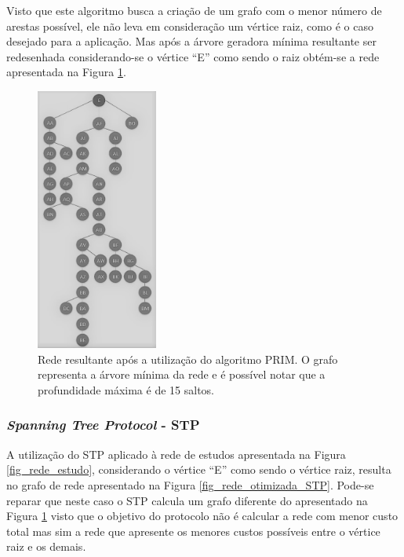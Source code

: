 \documentclass[12pt]{article}
\begin{document}
Visto que este algoritmo busca a criação de um grafo com o menor número de arestas possível, ele não leva em consideração um vértice raiz, como é o caso desejado para a aplicação. Mas após a árvore geradora mínima resultante ser redesenhada considerando-se o vértice ``E'' como sendo o raiz obtém-se a rede apresentada na Figura \ref{fig_rede_otimizada_prim}.

\begin{figure} %
	\centering
	\includegraphics[width=4cm]{Otimizada_Prim_PB}
	\caption{Rede resultante após a utilização do algoritmo PRIM. O grafo representa a árvore mínima da rede e é possível notar que a profundidade máxima é de 15 saltos.}
	\label{fig_rede_otimizada_prim}
\end{figure}

\subsubsection{\emph{Spanning Tree Protocol} - STP}
A utilização do STP aplicado à rede de estudos apresentada na Figura \ref{fig_rede_estudo}, considerando o vértice ``E'' como sendo o vértice raiz, resulta no grafo de rede apresentado na Figura \ref{fig_rede_otimizada_STP}. Pode-se reparar que neste caso o STP calcula um grafo diferente do apresentado na Figura \ref{fig_rede_otimizada_prim} visto que o objetivo do protocolo não é calcular a rede com menor custo total mas sim a rede que apresente os menores custos possíveis entre o vértice raiz e os demais.
\end{document}
